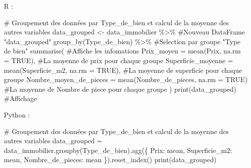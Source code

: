 \documentclass[
  letterpaper,
  DIV=11,
  numbers=noendperiod]{scrartcl}
\newenvironment{Shaded}{\begin{snugshade}}{\end{snugshade}}
\newcommand{\AttributeTok}[1]{\textcolor[rgb]{0.40,0.45,0.13}{#1}}
\newcommand{\CommentTok}[1]{\textcolor[rgb]{0.37,0.37,0.37}{#1}}
\newcommand{\ConstantTok}[1]{\textcolor[rgb]{0.56,0.35,0.01}{#1}}
\newcommand{\FunctionTok}[1]{\textcolor[rgb]{0.28,0.35,0.67}{#1}}
\newcommand{\NormalTok}[1]{\textcolor[rgb]{0.00,0.23,0.31}{#1}}
\newcommand{\OtherTok}[1]{\textcolor[rgb]{0.00,0.23,0.31}{#1}}
\newcommand{\SpecialCharTok}[1]{\textcolor[rgb]{0.37,0.37,0.37}{#1}}
\newcommand{\StringTok}[1]{\textcolor[rgb]{0.13,0.47,0.30}{#1}}
\begin{document}
R :

\begin{Shaded}
\begin{Highlighting}[]
\CommentTok{\# Groupement des données par Type\_de\_bien et calcul de la moyenne des autres variables}
\NormalTok{data\_grouped }\OtherTok{\textless{}{-}}\NormalTok{ data\_immobilier }\SpecialCharTok{\%\textgreater{}\%}                                 \CommentTok{\#Nouveau DataFrame "data\_grouped"}
  \FunctionTok{group\_by}\NormalTok{(Type\_de\_bien) }\SpecialCharTok{\%\textgreater{}\%}                                        \CommentTok{\#Selection par groupe "Type de bien"}
  \FunctionTok{summarise}\NormalTok{(                                                        }\CommentTok{\#Affiche les infomations}
    \AttributeTok{Prix\_moyen =} \FunctionTok{mean}\NormalTok{(Prix, }\AttributeTok{na.rm =} \ConstantTok{TRUE}\NormalTok{),                          }\CommentTok{\#La moyenne de prix pour chaque groupe}
    \AttributeTok{Superficie\_moyenne =} \FunctionTok{mean}\NormalTok{(Superficie\_m2, }\AttributeTok{na.rm =} \ConstantTok{TRUE}\NormalTok{),         }\CommentTok{\#La moyenne de superficie pour chaque groupe}
    \AttributeTok{Nombre\_moyen\_de\_pieces =} \FunctionTok{mean}\NormalTok{(Nombre\_de\_pieces, }\AttributeTok{na.rm =} \ConstantTok{TRUE}\NormalTok{)   }\CommentTok{\#La moyenne de Nombre de piece pour chaque groupe}
\NormalTok{  )}
\FunctionTok{print}\NormalTok{(data\_grouped)                                                 }\CommentTok{\#Affichage}
\end{Highlighting}
\end{Shaded}

Python :

\begin{Shaded}
\begin{Highlighting}[]
\CommentTok{\# Groupement des données par Type\_de\_bien et calcul de la moyenne des autres variables }
\NormalTok{data\_grouped }\OtherTok{=} \FunctionTok{data\_immobilier.groupby}\NormalTok{(}\StringTok{\textquotesingle{}Type\_de\_bien\textquotesingle{}}\NormalTok{)}\FunctionTok{.agg}\NormalTok{(\{}
    \StringTok{\textquotesingle{}Prix\textquotesingle{}}\SpecialCharTok{:} \StringTok{\textquotesingle{}mean\textquotesingle{}}\NormalTok{,}
    \StringTok{\textquotesingle{}Superficie\_m2\textquotesingle{}}\SpecialCharTok{:} \StringTok{\textquotesingle{}mean\textquotesingle{}}\NormalTok{,}
    \StringTok{\textquotesingle{}Nombre\_de\_pieces\textquotesingle{}}\SpecialCharTok{:} \StringTok{\textquotesingle{}mean\textquotesingle{}}
\NormalTok{\})}\FunctionTok{.reset\_index}\NormalTok{()}
\FunctionTok{print}\NormalTok{(data\_grouped)}
\end{Highlighting}
\end{Shaded}
\end{document}
